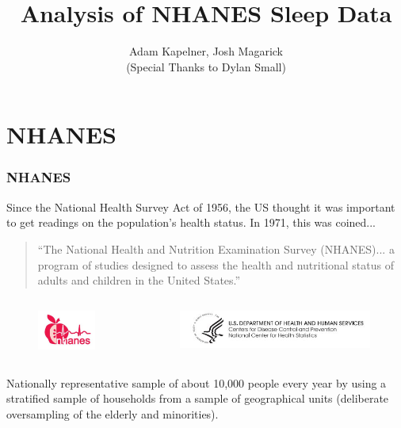 \documentclass[presentation]{beamer}
\title[Obs. Study on Sleep]{Analysis of NHANES Sleep Data}
\author[KM]{Adam Kapelner, Josh Magarick \\ {\tiny (Special Thanks to Dylan Small)}}
\institute[Wharton, Statistics]{Department of Statistics \\ The Wharton School, University of Pennsylvania}
\date[11/29/11]{}
\begin{document}
\frame{\titlepage}


\section{NHANES}

\begin{frame}
	\frametitle{NHANES}

Since the National Health Survey Act of 1956, \pause the US thought it was important to get readings on the population's health status. In 1971, this was coined... \pause 

\vspace{0.5cm}

\begin{quotation}
``The National Health and Nutrition Examination Survey (NHANES)... a program of studies designed to assess the health and nutritional status of adults and children in the United States.''
\end{quotation}

\begin{columns}
		\begin{column}{.2\textwidth}
\begin{figure}[htp]
\centering
\includegraphics[width=0.75in]{nhanes_logo.jpg}
\end{figure}
\FloatBarrier
		\end{column}
		\begin{column}{.8\textwidth}
\begin{figure}[htp]
\centering
\includegraphics[width=2.5in]{dohhs_logo.jpg}
\end{figure}
\FloatBarrier
		\end{column}
	\end{columns}

\vspace{0.5cm}

\pause

\footnotesize
Nationally representative sample of about 10,000 people every year by using a stratified sample of households from a sample of geographical units (deliberate oversampling of the elderly and minorities).
\normalsize

\end{frame}
\end{document}
